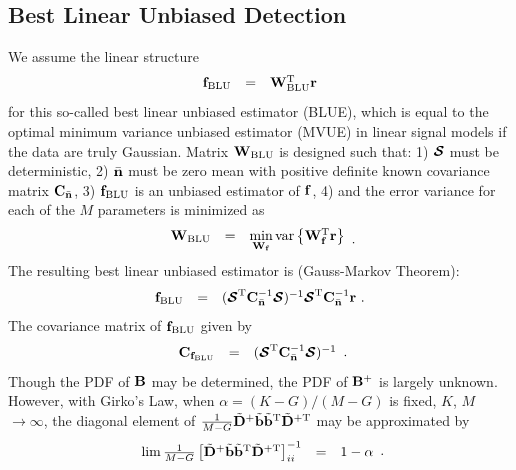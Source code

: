 \documentclass[a4paper,10pt,fleqn, twocolumn]{IEEETran}
\newcommand{\br}{{\mathbf r}}
\newcommand{\bb}{{\bf b}}
\newcommand{\bC}{{\bf C}}
\newcommand{\bn}{{\bf n}}
\newcommand{\bbf}{{\bf f}}
\newcommand{\bD}{{\bf D}}
\newcommand{\bW}{{\bf W}}
\newcommand{\bB}{{\bf B}}
\newcommand{\bcS}{{\mbox {\boldmath ${\cal S}$}}}
\begin{document}
\subsection{Best Linear Unbiased Detection}
We assume the linear structure
\begin{equation}
\begin{array}{rcl}
{\bbf}_{\rm BLU}&=&\bW_{\rm BLU}^{\rm T}\br
\end{array}
\end{equation}
\noindent for this so-called best linear unbiased estimator
(BLUE), which is equal to the optimal minimum variance unbiased
estimator (MVUE) in linear signal models if the data are truly
Gaussian. Matrix $\bW_{\rm BLU}$ is designed such that: 1) $\bcS$
must be deterministic, 2) $\bar{\bn}$ must be zero mean with
positive definite known covariance matrix $\bC_{\bar{\bn}}$, 3)
${\bbf}_{\rm BLU}$ is an unbiased estimator of $\bbf$, 4) and the
error variance for each of the $M$ parameters is minimized as
\begin{equation}
\begin{array}{rcl}
\bW_{\rm BLU}&=&\min\limits_{\bW_{\bbf}}
\mbox{var}\left\{\bW_{\bbf}^{\rm T}\br\right\}
\end{array}.
\end{equation}
\noindent The resulting best linear unbiased estimator is
(Gauss-Markov Theorem):
\begin{equation}
\begin{array}{rcl}
{\bbf}_{\rm BLU}&=&(\bcS^{\rm
T}\bC_{\bar{\bn}}^{-1}\bcS)^{-1}\bcS^{\rm
T}\bC_{\bar{\bn}}^{-1}\br\ .
\end{array} \label{BLUE}
\end{equation}
\noindent The covariance matrix of ${\bbf}_{\rm BLU}$ given by
\begin{equation}
\begin{array}{rcl}
{\bC}_{\bbf_{\rm BLU}}&=&(\bcS^{\rm
T}\bC_{\bar{\bn}}^{-1}\bcS)^{-1}
\end{array}.
\end{equation}
\noindent Though the PDF of $\bB$ may be determined, the PDF of
$\bB^{+}$ is largely unknown. However, with Girko's Law, when
$\alpha=(K-G)/(M-G)$ is fixed, $K$, $M$ $\rightarrow\infty$, the
diagonal element of
$\frac{1}{M-G}\tilde{\bD}^+\tilde{\bb}\tilde{\bb}^{\rm
T}\tilde{\bD}^{\rm +T}$ may be approximated by~\cite{Muller}
\begin{equation}
\begin{array}{rcl}
\lim\frac{1}{M-G}\left[\tilde{\bD}^+\tilde{\bb}\tilde{\bb}^{\rm
T}\tilde{\bD}^{\rm +T}\right]_{ii}^{-1}&=&1-\alpha
\end{array}.
\end{equation}
\end{document}
